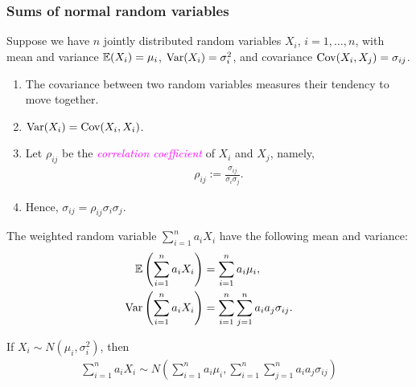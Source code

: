 \begin{frame}[fragile,t]
	\frametitle{Sums of normal random variables}

Suppose we have $n$ jointly distributed random variables $X_i$, $i=1,\dots,n$, with mean and
variance $\mathbb{E}(X_i ) = \mu_i$, $\text{Var}(X_i) =\sigma_i^2$, and covariance $\text{Cov}(X_i,X_j) = \sigma_{ij}$.
\bigskip

\begin{remark}
	\begin{enumerate}
		\item The covariance between two random variables measures their tendency to move together.
		\item $\text{Var}(X_i) = \text{Cov}(X_i,X_i)$.
		\item Let $\rho_{ij}$ be the \textcolor{magenta}{\it correlation coefficient} of $X_i$ and
			$X_j$, namely,
			\begin{align*}
				\rho_{ij} := \frac{\sigma_{ij}}{\sigma_i \sigma_j}.
			\end{align*}
		\item[] Hence, $\sigma_{ij}=\rho_{ij}\sigma_i\sigma_j$.
	\end{enumerate}
\end{remark}

\end{frame}
\begin{frame}[fragile,t]
\begin{mythm}
	The weighted random variable $\sum_{i=1}^{n} a_i X_i$ have the following mean and variance:
	\begin{align*}
		\mathbb{E}\left(\sum_{i=1}^{n} a_i X_i\right)   & = \sum_{i=1}^{n} a_i \mu_i, \\
		\text{Var}\left(\sum_{i=1}^{n} a_i X_i\right) & = \sum_{i=1}^{n} \sum_{j=1}^{n} a_i a_j \sigma_{ij}.
	\end{align*}
\end{mythm}
\end{frame}
\begin{frame}[fragile,t]
\begin{mythm}
	If $X_i\sim N\left(\mu_i,\sigma_i^2\right)$, then
	\begin{align*}
		\sum_{i=1}^{n} a_i X_i \sim N\left(\sum_{i=1}^{n} a_i \mu_i, \sum_{i=1}^{n} \sum_{j=1}^{n} a_i a_j
		\sigma_{ij}\right)
	\end{align*}
\end{mythm}
\end{frame}
